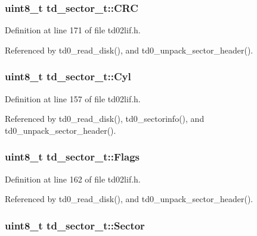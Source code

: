 \subsubsection[{\texorpdfstring{C\+RC}{CRC}}]{\setlength{\rightskip}{0pt plus 5cm}uint8\+\_\+t td\+\_\+sector\+\_\+t\+::\+C\+RC}\hypertarget{structtd__sector__t_aaccfa1ee85151410b042457fc5b584e5}{}\label{structtd__sector__t_aaccfa1ee85151410b042457fc5b584e5}


Definition at line 171 of file td02lif.\+h.



Referenced by td0\+\_\+read\+\_\+disk(), and td0\+\_\+unpack\+\_\+sector\+\_\+header().

\subsubsection[{\texorpdfstring{Cyl}{Cyl}}]{\setlength{\rightskip}{0pt plus 5cm}uint8\+\_\+t td\+\_\+sector\+\_\+t\+::\+Cyl}\hypertarget{structtd__sector__t_afddd9f1e3a41cc6e3a9be2478cd3305b}{}\label{structtd__sector__t_afddd9f1e3a41cc6e3a9be2478cd3305b}


Definition at line 157 of file td02lif.\+h.



Referenced by td0\+\_\+read\+\_\+disk(), td0\+\_\+sectorinfo(), and td0\+\_\+unpack\+\_\+sector\+\_\+header().

\subsubsection[{\texorpdfstring{Flags}{Flags}}]{\setlength{\rightskip}{0pt plus 5cm}uint8\+\_\+t td\+\_\+sector\+\_\+t\+::\+Flags}\hypertarget{structtd__sector__t_ad30cfc0c6589ff25f8456ada5b352efa}{}\label{structtd__sector__t_ad30cfc0c6589ff25f8456ada5b352efa}


Definition at line 162 of file td02lif.\+h.



Referenced by td0\+\_\+read\+\_\+disk(), and td0\+\_\+unpack\+\_\+sector\+\_\+header().

\subsubsection[{\texorpdfstring{Sector}{Sector}}]{\setlength{\rightskip}{0pt plus 5cm}uint8\+\_\+t td\+\_\+sector\+\_\+t\+::\+Sector}\hypertarget{structtd__sector__t_a703252220f745cd6adfedadd5cc993d6}{}\label{structtd__sector__t_a703252220f745cd6adfedadd5cc993d6}


